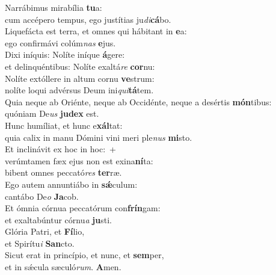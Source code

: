 \evenverse Narrábimus mirabília \textbf{tu}a:~\*\\
\evenverse cum accépero tempus, ego justítias ju\textit{di}\textbf{cá}bo.\\
\oddverse Liquefácta est terra, et omnes qui hábitant in \textbf{e}a:~\*\\
\oddverse ego confirmávi colúm\textit{nas} \textbf{e}jus.\\
\evenverse Dixi iníquis: Nolíte iníque \textbf{á}gere:~\*\\
\evenverse et delinquéntibus: Nolíte exaltá\textit{re} \textbf{cor}nu:\\
\oddverse Nolíte extóllere in altum cornu \textbf{ve}strum:~\*\\
\oddverse nolíte loqui advérsus Deum ini\textit{qui}\textbf{tá}tem.\\
\evenverse Quia neque ab Oriénte, neque ab Occidénte, neque a desértis \textbf{món}tibus:~\*\\
\evenverse quóniam De\textit{us} \textbf{ju}\textbf{dex} est.\\
\oddverse Hunc humíliat, et hunc e\textbf{xál}tat:~\*\\
\oddverse quia calix in manu Dómini vini meri ple\textit{nus} \textbf{mi}sto.\\
\evenverse Et inclinávit ex hoc in hoc:~+\\
\evenverse  verúmtamen fæx ejus non est exina\textbf{ní}ta:~\*\\
\evenverse bibent omnes peccató\textit{res} \textbf{ter}ræ.\\
\oddverse Ego autem annuntiábo in \textbf{sǽ}culum:~\*\\
\oddverse cantábo De\textit{o} \textbf{Ja}cob.\\
\evenverse Et ómnia córnua peccatórum con\textbf{frín}gam:~\*\\
\evenverse et exaltabúntur córnu\textit{a} \textbf{ju}sti.\\
\oddverse Glória Patri, et \textbf{Fí}lio,~\*\\
\oddverse et Spirítu\textit{i} \textbf{San}cto.\\
\evenverse Sicut erat in princípio, et nunc, et \textbf{sem}per,~\*\\
\evenverse et in sǽcula sæculó\textit{rum}. \textbf{A}men.\\
